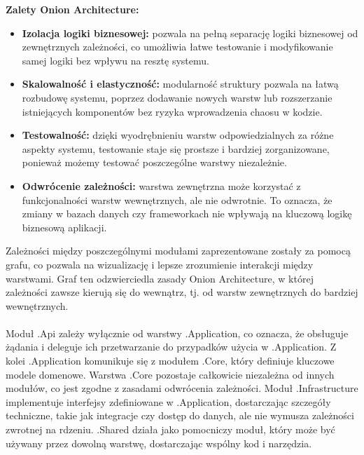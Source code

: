 \documentclass[12pt,a4paper]{article}
\begin{document}
\noindent \textbf{Zalety Onion Architecture:}
\begin{itemize}
    \item \textbf{Izolacja logiki biznesowej:} pozwala na pełną separację logiki biznesowej od zewnętrznych zależności, co umożliwia łatwe testowanie i modyfikowanie samej logiki bez wpływu na resztę systemu.
    \item \textbf{Skalowalność i elastyczność:} modularność struktury pozwala na łatwą rozbudowę systemu, poprzez dodawanie nowych warstw lub rozszerzanie istniejących komponentów bez ryzyka wprowadzenia chaosu w kodzie.
    \item \textbf{Testowalność:} dzięki wyodrębnieniu warstw odpowiedzialnych za różne aspekty systemu, testowanie staje się prostsze i bardziej zorganizowane, ponieważ możemy testować poszczególne warstwy niezależnie.
    \item \textbf{Odwrócenie zależności:} warstwa zewnętrzna może korzystać z funkcjonalności warstw wewnętrznych, ale nie odwrotnie. To oznacza, że zmiany w bazach danych czy frameworkach nie wpływają na kluczową logikę biznesową aplikacji.
\end{itemize}


\newpage

\noindent
Zależności między poszczególnymi modułami zaprezentowane zostały za pomocą grafu, co pozwala na wizualizację i lepsze zrozumienie interakcji między warstwami. Graf ten odzwierciedla zasady Onion Architecture, w której zależności zawsze kierują się do wewnątrz, tj. od warstw zewnętrznych do bardziej wewnętrznych.
\\\\
Moduł .Api zależy wyłącznie od warstwy .Application, co oznacza, że obsługuje żądania i deleguje ich przetwarzanie do przypadków użycia w .Application. Z kolei .Application komunikuje się z modułem .Core, który definiuje kluczowe modele domenowe. Warstwa .Core pozostaje całkowicie niezależna od innych modułów, co jest zgodne z zasadami odwrócenia zależności. Moduł .Infrastructure implementuje interfejsy zdefiniowane w .Application, dostarczając szczegóły techniczne, takie jak integracje czy dostęp do danych, ale nie wymusza zależności zwrotnej na rdzeniu. .Shared działa jako pomocniczy moduł, który może być używany przez dowolną warstwę, dostarczając wspólny kod i narzędzia.
\end{document}
